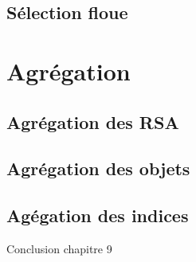 \subsection{Sélection floue}
\label{subsec:9-2-3}

\section{Agrégation}
\label{sec:9-3}

\subsection{Agrégation des RSA}
\label{subsec:9-3-1}

\subsection{Agrégation des objets}
\label{subsec:9-3-2}

\subsection{Agégation des indices}
\label{subsec:9-3-3}


Conclusion chapitre 9

